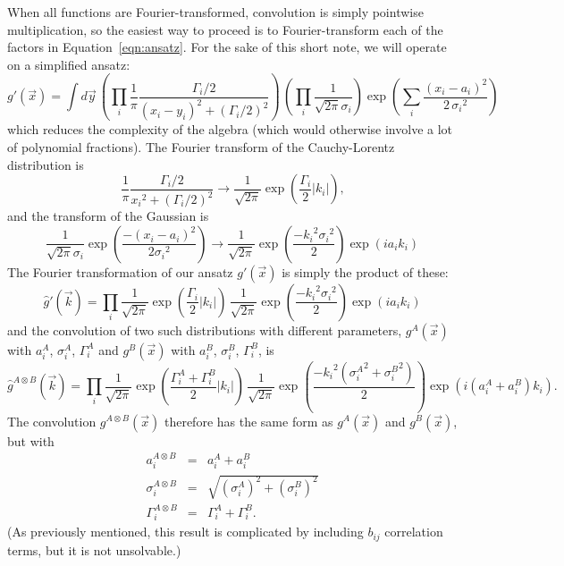 \documentclass[12pt]{article}
\begin{document}
When all functions are Fourier-transformed, convolution is simply
pointwise multiplication, so the easiest way to proceed is to
Fourier-transform each of the factors in Equation~\ref{eqn:ansatz}.
For the sake of this short note, we will operate on a simplified
ansatz:
\begin{equation}
g'(\vec{x}) = \int d\vec{y} \, \left(\prod_i \frac{1}{\pi}\frac{\Gamma_i/2}{(x_i - y_i)^2 + (\Gamma_i/2)^2}\right)
\, \left(\prod_i \frac{1}{\sqrt{2\pi} \sigma_i} \right)\exp\left(\sum_i \frac{(x_i - a_i)^2}{2 \, {\sigma_i}^2} \right)
\label{eqn:ansatz2}
\end{equation}
which reduces the complexity of the algebra (which would otherwise
involve a lot of polynomial fractions).  The Fourier transform of the
Cauchy-Lorentz distribution is
\begin{equation}
\frac{1}{\pi}\frac{\Gamma_i/2}{{x_i}^2 + (\Gamma_i/2)^2} \to \frac{1}{\sqrt{2\pi}} \exp\left(\frac{\Gamma_i}{2} |k_i|\right)\mbox{,}
\end{equation}
and the transform of the Gaussian is
\begin{equation}
\frac{1}{\sqrt{2\pi} \sigma_i} \exp\left(\frac{-(x_i - a_i)^2}{2 {\sigma_i}^2}\right) \to
\frac{1}{\sqrt{2\pi}} \exp\left(\frac{-{k_i}^2 {\sigma_i}^2}{2}\right) \exp(ia_i k_i)
\end{equation}
The Fourier transformation of our ansatz $g'(\vec{x})$ is simply the product of
these:
\begin{equation}
\hat{g}'(\vec{k}) = \prod_i \frac{1}{\sqrt{2\pi}} \exp\left(\frac{\Gamma_i}{2} |k_i|\right) \, \frac{1}{\sqrt{2\pi}} \exp\left(\frac{-{k_i}^2 {\sigma_i}^2}{2}\right) \exp(ia_i k_i)
\end{equation}
and the convolution of two such distributions with different
parameters, $g^A(\vec{x})$ with $a_i^A$, $\sigma_i^A$, $\Gamma_i^A$
and $g^B(\vec{x})$ with $a_i^B$, $\sigma_i^B$, $\Gamma_i^B$, is
\begin{equation}
\hat{g}^{A\otimes B}(\vec{k}) = \prod_i \frac{1}{\sqrt{2\pi}} \exp\left(\frac{\Gamma_i^A + \Gamma_i^B}{2} |k_i|\right) \, \frac{1}{\sqrt{2\pi}} \exp\left(\frac{-{k_i}^2 ({\sigma_i^A}^2 + {\sigma_i^B}^2)}{2}\right) \exp\left(i(a_i^A + a_i^B) k_i\right)\mbox{.}
\end{equation}
The convolution $g^{A\otimes B}(\vec{x})$ therefore has the same form
as $g^A(\vec{x})$ and $g^B(\vec{x})$, but with
\begin{eqnarray}
a_i^{A\otimes B} &=& a_i^A + a_i^B \\
\sigma_i^{A\otimes B} &=& \sqrt{(\sigma_i^A)^2 + (\sigma_i^B)^2} \\
\Gamma_i^{A\otimes B} &=& \Gamma_i^A + \Gamma_i^B\mbox{.}
\end{eqnarray}
(As previously mentioned, this result is complicated by including
$b_{ij}$ correlation terms, but it is not unsolvable.)
\end{document}
